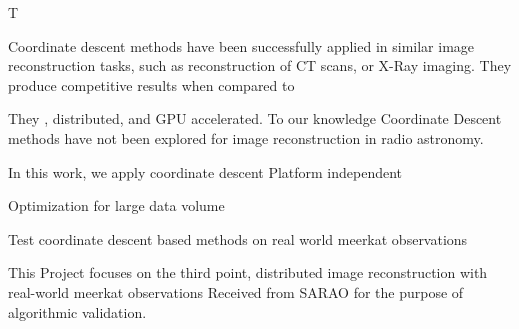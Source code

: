 T

Coordinate descent methods have been successfully applied in similar image reconstruction tasks, such as reconstruction of CT scans\cite{bouman1996unified}, or X-Ray imaging\cite{felix2017compressed}. They produce competitive results when compared to 

They   \cite{nesterov2012efficiency}, distributed\cite{fercoq2014fast}, and GPU accelerated\cite{mcgaffin2015edge}. To our knowledge Coordinate Descent methods have not been explored for image reconstruction in radio astronomy. 



In this work, we apply coordinate descent
Platform independent 


Optimization for large data volume\cite{richtarik2016distributed}

Test coordinate descent based methods on real world meerkat observations

This Project focuses on the third point, distributed image reconstruction with real-world meerkat observations
Received from SARAO for the purpose of algorithmic validation.

